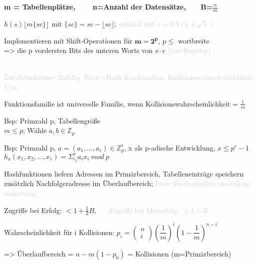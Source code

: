 \textbf{m = Tabellenplätze, ~~~ n=Anzahl der Datensätze, ~~~B=$\frac{n}{m}$} 

$h(s) \lfloor m \lbrace sc \rbrace \rfloor$ mit $ \lbrace sc \rbrace  = sc - \lfloor sc \rfloor$;
\textcolor{lightgray}{optimal mit c = $0.5(1+\sqrt{5})$ }

Implementieren mit Shift-Operationen für $\mathbf{m = 2^p}$, p$\leq$ wortbreite\\
=> die p vordersten Bits des unteren Worts von $s\cdot c$ \textcolor{lightgray}{(low-Register)}


\\
\textcolor{lightgray}{Zufallsfunktion= Zufällig Wert->Hash Kombination,
Kollisionswahrscheinlichkeit: 1/m}

Funktionsfamilie ist universelle Familie, wenn Kollisionswahrscheinlichkeit = $\frac{1}{m}$

Bsp: Primzahl p, Tabellengröße \\  $m \leq p$; Wähle $a,b \in \mathbb{Z}_p$\\

Bsp: Primzahl p, $a=(a_1,\dots,a_r) \in \mathbb{Z}_p^r$, x als p-adische Entwicklung, $x \leq p^r-1$\\
$h_a( x_1, x_2, \dots ,x_r ) = \Sigma_{i_1}^r a_i x_i ~mod ~p$

Hashfunktionen liefern Adressen im Primärbereich, Tabelleneinträge speichern zusätzlich Nachfolgeradresse im Überlaufbereich; \textcolor{lightgray}{Freie überlaufzellen zusätzliche verkettung}


Zugriffe bei Erfolg: $<1+\frac{1}{2}B$, ~~~\textcolor{lightgray}{Zugriffe bei Misserfolg: $\leq 1+ B$}

Wahrscheinlichkeit für i Kollisionen: $p_i = \left( \begin{array}{c}n \\ i\end{array} \right) \left( \dfrac{1}{m} \right)^i \left( 1- \dfrac{1}{m} \right)^{n-i} $

=> Überlaufbereich = $n-m(1-p_0)$  =  Kollisionen (m=Primärbereich) 

